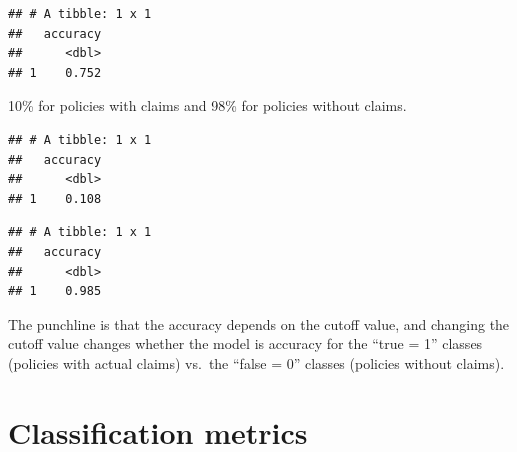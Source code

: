 \documentclass[
  openany]{book}
\newenvironment{Shaded}{\begin{snugshade}}{\end{snugshade}}
\newcommand{\DataTypeTok}[1]{\textcolor[rgb]{0.13,0.29,0.53}{#1}}
\newcommand{\DecValTok}[1]{\textcolor[rgb]{0.00,0.00,0.81}{#1}}
\newcommand{\KeywordTok}[1]{\textcolor[rgb]{0.13,0.29,0.53}{\textbf{#1}}}
\newcommand{\NormalTok}[1]{#1}
\newcommand{\OperatorTok}[1]{\textcolor[rgb]{0.81,0.36,0.00}{\textbf{#1}}}
\newcommand{\StringTok}[1]{\textcolor[rgb]{0.31,0.60,0.02}{#1}}
\begin{document}
\begin{verbatim}
## # A tibble: 1 x 1
##   accuracy
##      <dbl>
## 1    0.752
\end{verbatim}

10\% for policies with claims and 98\% for policies without claims.

\begin{Shaded}
\end{Shaded}

\begin{verbatim}
## # A tibble: 1 x 1
##   accuracy
##      <dbl>
## 1    0.108
\end{verbatim}

\begin{Shaded}
\end{Shaded}

\begin{verbatim}
## # A tibble: 1 x 1
##   accuracy
##      <dbl>
## 1    0.985
\end{verbatim}

The punchline is that the accuracy depends on the cutoff value, and changing the cutoff value changes whether the model is accuracy for the ``true = 1'' classes (policies with actual claims) vs.~the ``false = 0'' classes (policies without claims).

\hypertarget{classification-metrics}{%
\chapter{Classification metrics}\label{classification-metrics}}
\end{document}
